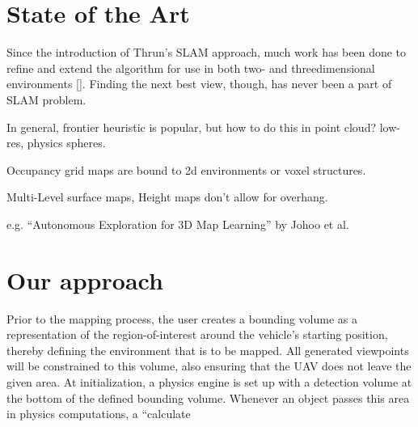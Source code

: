 \documentclass[letterpaper, 10 pt, conference]{ieeeconf}  %
\begin{document}
\section{State of the Art}

Since the introduction of Thrun's SLAM approach, much work has been done to refine and extend the algorithm for use in both two- and threedimensional environments []. Finding the next best view, though, has never been a part of SLAM problem.

In general, frontier heuristic is popular, but how to do this in point cloud? low-res, physics spheres.


Occupancy grid maps are bound to 2d environments or voxel structures.

Multi-Level surface maps, Height maps don't allow for overhang.

e.g. ``Autonomous Exploration for 3D Map Learning'' by Johoo et al.

\section{Our approach}

Prior to the mapping process, the user creates a bounding volume as a representation of the region-of-interest around the vehicle's starting position, thereby defining the environment that is to be mapped. All generated viewpoints will be constrained to this volume, also ensuring that the UAV does not leave the given area. At initialization, a physics engine is set up with a detection volume at the bottom of the defined bounding volume. Whenever an object passes this area in physics computations, a ``calculate
\end{document}
